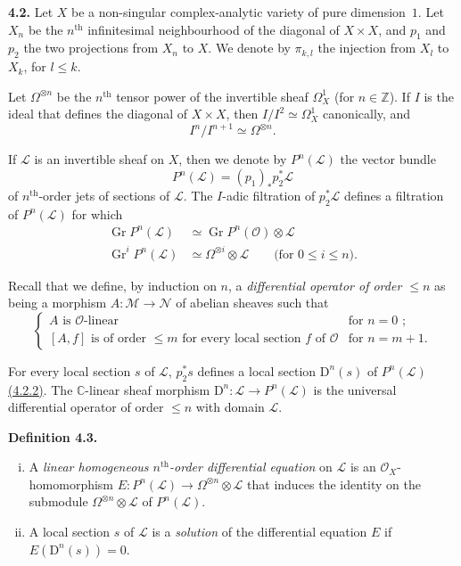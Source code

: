 \documentclass{report}
\newenvironment{rmenv}[1]
  {\phantomsection\par\medskip\noindent\textbf{#1.}\rmfamily}
  {\par\medskip}
\newcommand{\scr}[1]{{\mathscr{#1}}}
\renewcommand{\cal}[1]{{\mathcal{#1}}}
\newcommand{\CC}{\mathbb{C}}
\newcommand{\ZZ}{\mathbb{Z}}
\newcommand{\DD}{\mathrm{D}}
\renewcommand{\leq}{\leqslant}
\DeclareMathOperator{\Gr}{Gr}
\newcommand{\oldpage}[1]{\marginpar{\footnotesize$\Big\vert$ \textit{p.~#1}}}
\begin{document}
\begin{rmenv}{4.2}
\label{I.4.2}
  Let $X$ be a non-singular complex-analytic variety of pure dimension~$1$.
  Let $X_n$ be the $n^\mathrm{th}$ infinitesimal neighbourhood of the diagonal of $X\times X$, and $p_1$ and $p_2$ the two projections from $X_n$ to $X$.
  We denote by $\pi_{k,l}$ the injection from $X_l$ to
\oldpage{24}
  $X_k$, for $l\leq k$.

  Let $\Omega^{\otimes n}$ be the $n^\mathrm{th}$ tensor power of the invertible sheaf $\Omega_X^1$ (for $n\in\ZZ$).
  If $I$ is the ideal that defines the diagonal of $X\times X$, then $I/I^2\simeq\Omega_X^1$ canonically, and
  \[
  \label{I.4.2.1}
    I^n/I^{n+1} \simeq \Omega^{\otimes n}.
  \tag{4.2.1}
  \]

  If $\scr{L}$ is an invertible sheaf on $X$, then we denote by $P^n(\scr{L})$ the vector bundle
  \[
  \label{I.4.2.2}
    P^n(\scr{L}) = (p_1)_*p_2^*\scr{L}
  \tag{4.2.2}
  \]
  of $n^\mathrm{th}$-order jets of sections of $\scr{L}$.
  The $I$-adic filtration of $p_2^*\scr{L}$ defines a filtration of $P^n(\scr{L})$ for which
  \[
  \label{I.4.2.3}
    \begin{aligned}
      \Gr P^n(\scr{L}) &\simeq \Gr P^n(\cal{O})\otimes\scr{L}
    \\\Gr^i P^n(\scr{L}) &\simeq \Omega^{\otimes i}\otimes\scr{L} \qquad\mbox{(for $0\leq i\leq n$).}
    \end{aligned}
  \tag{4.2.3}
  \]

  Recall that we define, by induction on $n$, a \emph{differential operator of order $\leq n$} as being a morphism $A\colon\scr{M}\to\scr{N}$ of abelian sheaves such that
  \[
    \begin{cases}
      \mbox{$A$ is $\cal{O}$-linear} & \mbox{for $n=0$ ;}
    \\\mbox{$[A,f]$ is of order $\leq m$ for every local section $f$ of $\cal{O}$} & \mbox{for $n=m+1$.}
    \end{cases}
  \]

  For every local section $s$ of $\scr{L}$, $p_2^*s$ defines a local section $\DD^n(s)$ of $P^n(\scr{L})$ \hyperref[I.4.2.2]{(4.2.2)}.
  The $\CC$-linear sheaf morphism $\DD^n\colon\scr{L}\to P^n(\scr{L})$ is the universal differential operator of order $\leq n$ with domain $\scr{L}$.
\end{rmenv}

\begin{rmenv}{Definition 4.3}
\label{I.4.3}
  \begin{enumerate}[(i)]
    \item A \emph{linear homogeneous $n^\mathrm{th}$-order differential equation} on $\scr{L}$ is an $\cal{O}_X$-homomorphism $E\colon P^n(\scr{L})\to\Omega^{\otimes n}\otimes\scr{L}$ that induces the identity on the submodule $\Omega^{\otimes n}\otimes\scr{L}$ of $P^n(\scr{L})$.
    \item A local section $s$ of $\scr{L}$ is a \emph{solution} of the differential equation $E$ if $E(\DD^n(s))=0$.
  \end{enumerate}
\end{rmenv}
\end{document}
